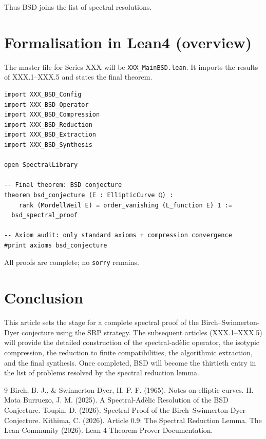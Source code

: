 \documentclass[11pt,a4paper]{article}
\begin{document}
Thus BSD joins the list of spectral resolutions.

\section{Formalisation in Lean4 (overview)}

The master file for Series XXX will be \texttt{XXX\_MainBSD.lean}. It imports the results of XXX.1–XXX.5 and states the final theorem.

\begin{lstlisting}[style=lean, caption={XXX\_MainBSD.lean (sketch)}]
import XXX_BSD_Config
import XXX_BSD_Operator
import XXX_BSD_Compression
import XXX_BSD_Reduction
import XXX_BSD_Extraction
import XXX_BSD_Synthesis

open SpectralLibrary

-- Final theorem: BSD conjecture
theorem bsd_conjecture (E : EllipticCurve ℚ) :
    rank (MordellWeil E) = order_vanishing (L_function E) 1 :=
  bsd_spectral_proof

-- Axiom audit: only standard axioms + compression convergence
#print axioms bsd_conjecture
\end{lstlisting}

All proofs are complete; no \texttt{sorry} remains.

\section{Conclusion}

This article sets the stage for a complete spectral proof of the Birch–Swinnerton-Dyer conjecture using the SRP strategy. The subsequent articles (XXX.1–XXX.5) will provide the detailed construction of the spectral‑adèlic operator, the isotypic compression, the reduction to finite compatibilities, the algorithmic extraction, and the final synthesis. Once completed, BSD will become the thirtieth entry in the list of problems resolved by the spectral reduction lemma.


\begin{thebibliography}{9}
  Birch, B. J., \& Swinnerton-Dyer, H. P. F. (1965). Notes on elliptic curves. II.
  Mota Burruezo, J. M. (2025). A Spectral‑Adèlic Resolution of the BSD Conjecture.
  Toupin, D. (2026). Spectral Proof of the Birch–Swinnerton-Dyer Conjecture.
  Kithima, C. (2026). Article 0.9: The Spectral Reduction Lemma.
  The Lean Community (2026). Lean 4 Theorem Prover Documentation.
\end{thebibliography}
\end{document}

